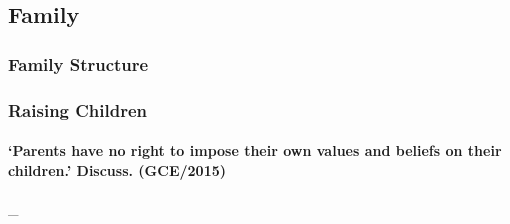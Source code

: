 \documentclass[../../main]{subfiles}
\begin{document}
\subsection{Family}

\subsubsection{Family Structure}

\subsubsection{Raising Children}

	\paragraph{`Parents have no right to impose their own values and beliefs on their children.' Discuss. (GCE/2015)} \_
\end{document}
